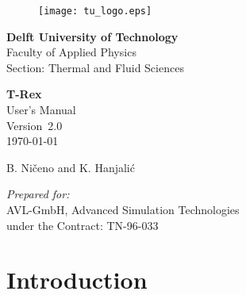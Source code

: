 \documentclass[10pt]{article}
\newcommand*{\tn}{\sffamily} %
\begin{document}
 
    
    \begin{titlepage}

    \begin{flushleft}
    \begin{figure}
    \texttt{[image: tu\_logo.eps]}
    \end{figure}

    {\large\bf Delft University of Technology } \\
    {\large    Faculty of Applied Physics }\\
    {\large    Section: Thermal and Fluid Sciences} \\
    \end{flushleft}

    \vspace*{1.0cm}

    \begin{center}

    {\Huge \bf \tn T-Rex \\ }
    \vspace*{1.0cm}
    {\LARGE \tn User's Manual \\ }
    \vspace*{1.0cm}
    {\large \tn Version~2.0 \\ }
    {\large \tn \today \\ }

    \vspace*{2.0cm}

    {\large B. Ni\v{c}eno and K. Hanjali\'{c}}

    \vspace*{4.0cm}

    {\large\em Prepared for:} \\
    {\large    AVL-GmbH, Advanced Simulation Technologies }\\
    {\large    under the Contract: TN-96-033 } \\

    \end{center}
 

    \end{titlepage}

    \tableofcontents

%
    \newpage
    \section{Introduction}
%
\end{document}
